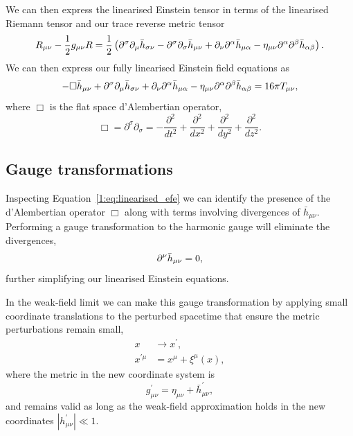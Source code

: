 We can then express the linearised Einstein tensor in terms of the linearised Riemann tensor and our trace reverse metric tensor~\cite{Moore_book:2012}
%
\begin{equation}
    R_{\mu\nu} - \frac{1}{2}g_{\mu\nu}R = \frac{1}{2}\left(\partial^{\sigma}\partial_{\mu}\Bar{h}_{\sigma\nu} - \partial^{\sigma}\partial_{\sigma}\Bar{h}_{\mu\nu} + \partial_{\nu}\partial^{\alpha}\Bar{h}_{\mu\alpha} - \eta_{\mu\nu}\partial^{\alpha}\partial^{\beta}\Bar{h}_{\alpha\beta}\right).
\end{equation}
%
We can then express our fully linearised Einstein field equations as
%
\begin{equation}
    - \Box\Bar{h}_{\mu\nu} + \partial^{\sigma}\partial_{\mu}\Bar{h}_{\sigma\nu}  + \partial_{\nu}\partial^{\alpha}\Bar{h}_{\mu\alpha} - \eta_{\mu\nu}\partial^{\alpha}\partial^{\beta}\Bar{h}_{\alpha\beta} = 16\pi T_{\mu\nu},
    \label{1:eq:linearised_efe}
\end{equation}
%
where $\Box$ is the flat space d'Alembertian operator,
%
\begin{equation}
    \Box = \partial^{\sigma}\partial_{\sigma} = -\frac{\partial^{2}}{dt^{2}} + \frac{\partial^{2}}{dx^{2}} + \frac{\partial^{2}}{dy^{2}} + \frac{\partial^{2}}{dz^{2}}.
\end{equation}
%

\subsection{\label{1:sec:gauge-transformations}Gauge transformations}

Inspecting Equation~\ref{1:eq:linearised_efe} we can identify the presence of the d'Alembertian operator $\Box$ along with terms involving divergences of $\bar{h}_{\mu\nu}$. Performing a gauge transformation to the 
harmonic gauge will eliminate the divergences,
%
\begin{equation}
    \partial^{\nu} \Bar{h}_{\mu\nu} = 0,
    \label{1:eq:divergence_gone}
\end{equation}
%
further simplifying our linearised Einstein equations.

In the weak-field limit we can make this gauge transformation by applying small coordinate translations to the perturbed spacetime that ensure the metric perturbations remain small,
%
\begin{align}
    x &\rightarrow x^{\prime}, \\
    x^{\prime\mu} &= x^{\mu} + \xi^{\mu}(x),
    \label{1:eq:gauge_transform}
\end{align}
%
where the metric in the new coordinate system is
%
\begin{equation}
    g^{\prime}_{\mu\nu} = \eta_{\mu\nu} + \bar{h}^{\prime}_{\mu\nu},
    \label{1:eq:gauge_metric}
\end{equation}
%
and remains valid as long as the weak-field approximation holds in the new coordinates $|h^{\prime}_{\mu\nu}| \ll 1$.

